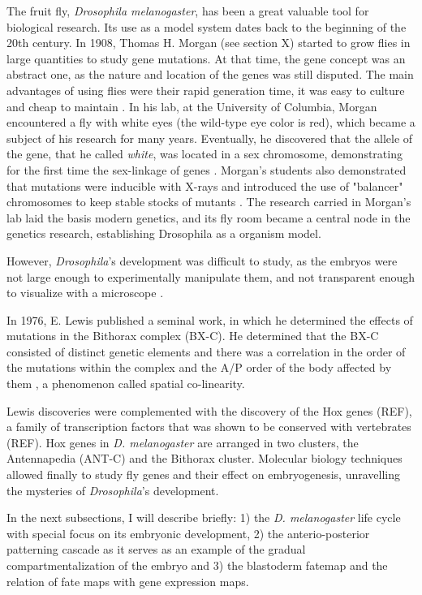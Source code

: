 The fruit fly, \textit{Drosophila melanogaster}, has been a great valuable tool for biological research.
Its use as a model system dates back to the beginning of the 20th century.
In 1908, Thomas H. Morgan (see section X) started to grow flies in large quantities to study gene mutations. At that time, the gene concept was an abstract one, as the nature and location of the genes was still disputed.
%
The main advantages of using flies were their rapid generation time, it was easy to culture and cheap to maintain \citep{Arias2008}.
%
In his lab, at the University of Columbia, Morgan encountered a fly with white eyes (the wild-type eye color is red), which became a subject of his research for many years.
Eventually, he discovered that the allele of the gene, that he called \textit{white}, was located in a sex chromosome, demonstrating for the first time the sex-linkage of genes \citep{Morgan1919}.
%
Morgan's students also demonstrated that mutations were inducible with X-rays and introduced the use of "balancer" chromosomes to keep stable stocks of mutants \citep{Arias2008}.
%
The research carried in Morgan's lab laid the basis modern genetics, and its fly room became a central node in the genetics research, establishing Drosophila as a organism model.

However, \textit{Drosophila}'s development was difficult to study, as the embryos were not large enough to experimentally manipulate them, and not transparent enough to visualize with a microscope \citep{Gilbert2014}.


In 1976, E. Lewis published a seminal work, in which he determined the effects of mutations in the Bithorax complex (BX-C).
He determined that the BX-C consisted of distinct genetic elements and there was a correlation in the order of the mutations within the complex and the A/P order of the body affected by them \citep{Lewis1978}, a phenomenon called spatial co-linearity.

Lewis discoveries were complemented with the discovery of the Hox genes (REF), a family of transcription factors that was shown to be conserved with vertebrates (REF).
Hox genes in \textit{D. melanogaster} are arranged in two clusters, the Antennapedia (ANT-C) and the Bithorax cluster.
Molecular biology techniques allowed finally to study fly genes and their effect on embryogenesis, unravelling the mysteries of \textit{Drosophila}'s development.

In the next subsections, I will describe briefly: 1) the \textit{D. melanogaster} life cycle with special focus on its embryonic development, 2) the anterio-posterior patterning cascade as it serves as an example of the gradual compartmentalization of the embryo and 3) the blastoderm fatemap and the relation of fate maps with gene expression maps.

